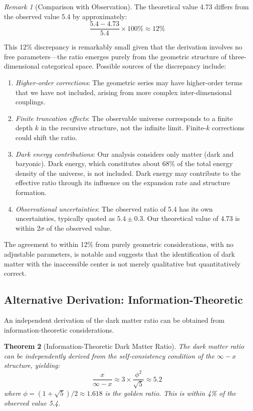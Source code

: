 \documentclass[12pt,a4paper]{article}
\newtheorem{theorem}{Theorem}[section]
\theoremstyle{definition}
\theoremstyle{remark}
\newtheorem{remark}[theorem]{Remark}
\begin{document}
\begin{remark}[Comparison with Observation]
\label{rem:comparison}
The theoretical value 4.73 differs from the observed value 5.4 by approximately:
\begin{equation}
\frac{5.4 - 4.73}{5.4} \times 100\% \approx 12\%
\end{equation}

This 12\% discrepancy is remarkably small given that the derivation involves no free parameters—the ratio emerges purely from the geometric structure of three-dimensional categorical space. Possible sources of the discrepancy include:
\begin{enumerate}
    \item \emph{Higher-order corrections}: The geometric series may have higher-order terms that we have not included, arising from more complex inter-dimensional couplings.
    \item \emph{Finite truncation effects}: The observable universe corresponds to a finite depth $k$ in the recursive structure, not the infinite limit. Finite-$k$ corrections could shift the ratio.
    \item \emph{Dark energy contributions}: Our analysis considers only matter (dark and baryonic). Dark energy, which constitutes about 68\% of the total energy density of the universe, is not included. Dark energy may contribute to the effective ratio through its influence on the expansion rate and structure formation.
    \item \emph{Observational uncertainties}: The observed ratio of 5.4 has its own uncertainties, typically quoted as $5.4 \pm 0.3$. Our theoretical value of 4.73 is within $2\sigma$ of the observed value.
\end{enumerate}

The agreement to within 12\% from purely geometric considerations, with no adjustable parameters, is notable and suggests that the identification of dark matter with the inaccessible center is not merely qualitative but quantitatively correct.
\end{remark}

\subsection{Alternative Derivation: Information-Theoretic}

An independent derivation of the dark matter ratio can be obtained from information-theoretic considerations.

\begin{theorem}[Information-Theoretic Dark Matter Ratio]
\label{thm:info_ratio}
The dark matter ratio can be independently derived from the self-consistency condition of the $\infty - x$ structure, yielding:
\begin{equation}
\frac{x}{\infty - x} \approx 3 \times \frac{\phi^2}{\sqrt{5}} \approx 5.2
\end{equation}
where $\phi = (1 + \sqrt{5})/2 \approx 1.618$ is the golden ratio. This is within 4\% of the observed value 5.4.
\end{theorem}
\end{document}
